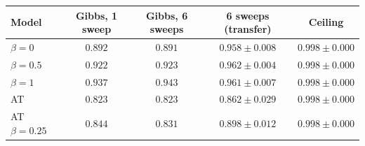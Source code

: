 \begin{tabular}{lcccc}
\toprule
Model & Gibbs, 1 sweep & Gibbs, 6 sweeps & 6 sweeps (transfer) & Ceiling \\
\midrule
$\beta=0$ & $0.892$ & $0.891$ & $0.958 \pm 0.008$ & $0.998 \pm 0.000$ \\
$\beta=0.5$ & $0.922$ & $0.923$ & $0.962 \pm 0.004$ & $0.998 \pm 0.000$ \\
$\beta=1$ & $\mathbf{0.937}$ & $\mathbf{0.943}$ & $0.961 \pm 0.007$ & $0.998 \pm 0.000$ \\
AT & $0.823$ & $0.823$ & $0.862 \pm 0.029$ & $0.998 \pm 0.000$ \\
AT $\beta=0.25$ & $0.844$ & $0.831$ & $0.898 \pm 0.012$ & $0.998 \pm 0.000$ \\
\bottomrule
\end{tabular}
